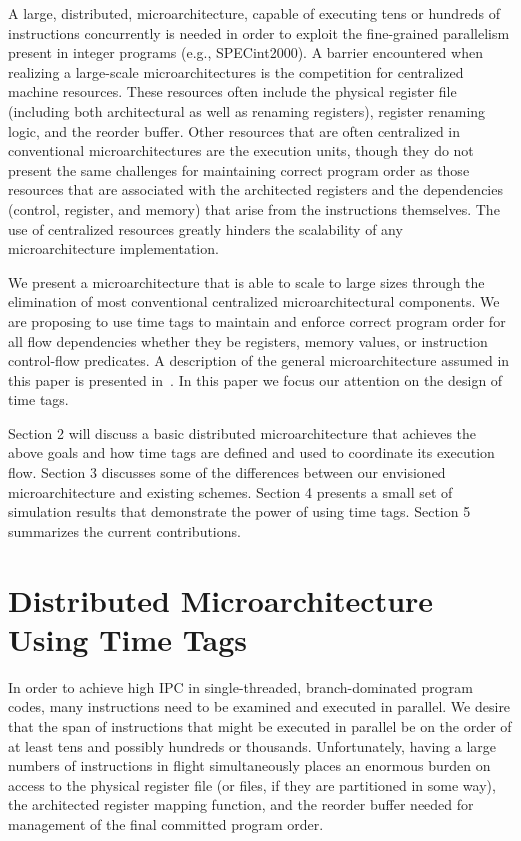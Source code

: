\documentclass[10pt,twocolumn,dvips]{article}
\begin{document}
A large, distributed, microarchitecture, capable of executing tens or
hundreds of instructions concurrently
is needed in order to exploit the fine-grained parallelism present 
in integer programs (e.g., SPECint2000).
A barrier encountered when realizing a large-scale microarchitectures is the
competition for centralized machine resources.
These resources often include the 
physical register file (including both architectural as well as renaming 
registers), register renaming logic,
and the reorder buffer.  Other resources that are often centralized
in conventional microarchitectures are the execution units, though they
do not present the same challenges for maintaining correct program order
as those resources that are associated with the architected registers
and the dependencies (control, register, and memory) that arise
from the instructions themselves.  The use of centralized resources
greatly hinders the scalability of any microarchitecture implementation. 

We present a microarchitecture that is able to scale to large sizes
through the
elimination of most conventional centralized microarchitectural components.
We are proposing to use time tags to maintain 
and enforce correct program order for all flow dependencies whether
they be registers, memory values, or instruction control-flow predicates.
A description of the general microarchitecture
assumed in this paper is presented in~\cite{Uht01}.  In this paper
we focus our attention on the design of time tags.

Section 2 will discuss a basic distributed microarchitecture that
achieves the above goals and how time tags are defined and used
to coordinate its execution flow.  
Section 3 discusses some of the differences between our envisioned
microarchitecture and existing schemes.
Section 4 presents a small set of simulation results that demonstrate
the power of using time tags. 
Section 5 
summarizes the current contributions.
\section{Distributed Microarchitecture Using Time Tags}
\vspace{-0.1in}
In order to achieve high IPC in single-threaded, branch-dominated 
program codes, many instructions need to be examined and executed
in parallel.  We desire that the span of instructions that might be
executed in parallel be on the order of at least tens and possibly hundreds
or thousands.  Unfortunately, having a large numbers of instructions
in flight simultaneously places an enormous burden on access to 
the physical register file (or files, if they are partitioned in some way),
the architected register mapping function, and the reorder buffer 
needed for
management of the final committed program order.
\vspace{-0.2in}
\end{document}
